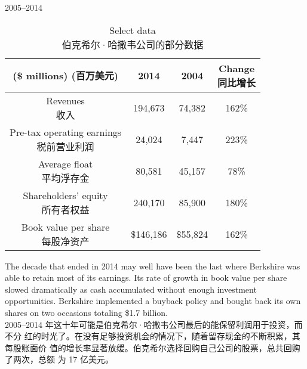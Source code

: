 \begin{section}{2005--2014}

\begin{table}[!htbp]
  \centering
  \begin{center}
    \begin{tabular}{cccc}
      \toprule
      \makecell[c]{(\$ millions) \\ (百万美元)} & 2014 & 2004 & \makecell[c]{Change \\ 同比增长} \\
      \midrule
      \makecell[c]{Revenues \\ 收入} & 194,673 & 74,382 & 162\% \\
      \makecell[c]{Pre-tax operating earnings \\ 税前营业利润} & 24,024 & 7,447 & 223\% \\
      \makecell[c]{Average float \\ 平均浮存金} & 80,581 & 45,157 & 78\% \\
      \makecell[c]{Shareholders' equity \\ 所有者权益} & 240,170 & 85,900 & 180\% \\
      \makecell[c]{Book value per share \\ 每股净资产} & \$146,186 & \$55,824 & 162\% \\
      \bottomrule
    \end{tabular}
    \caption{Select data \\ 伯克希尔·哈撒韦公司的部分数据}
  \end{center}
\end{table}

\begin{verseparallel}
  {
    The decade that ended in 2014 may well have been the last where Berkshire
    was able to retain most of its earnings. Its rate of growth in book value
    per share slowed dramatically as cash accumulated without enough investment
    opportunities. Berkshire implemented a buyback policy and bought back its
    own shares on two occasions totaling \$1.7 billion. \\
  }
  {
    2005--2014 年这十年可能是伯克希尔·哈撒韦公司最后的能保留利润用于投资，而不分
    红的时光了。在没有足够投资机会的情况下，随着留存现金的不断积累，其每股账面价
    值的增长率显著放缓。伯克希尔选择回购自己公司的股票，总共回购了两次，总额
    为 17 亿美元。
  }
\end{verseparallel}


\end{section}
